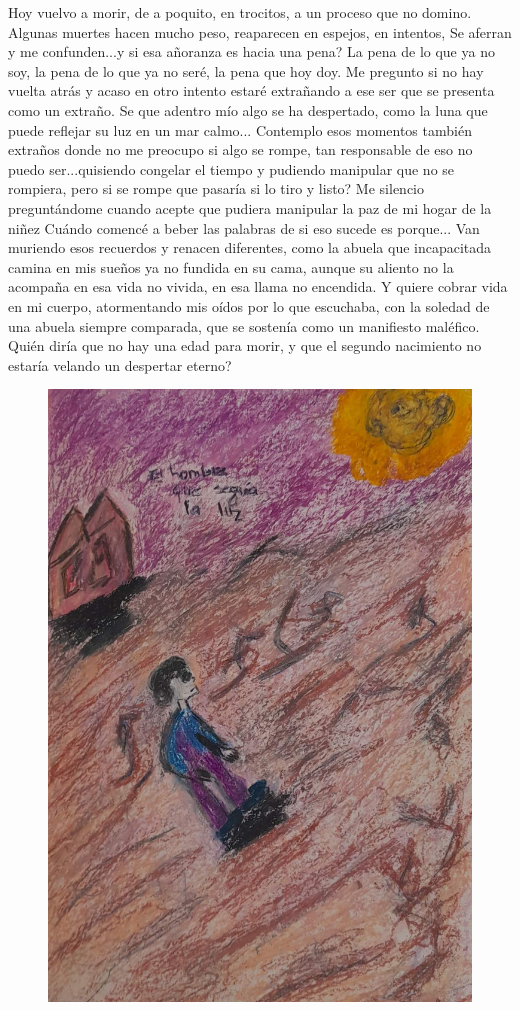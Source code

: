 \documentclass[12pt, a4paper, twoside]{book} %
\begin{document}
Hoy vuelvo a morir, de a poquito, en trocitos, a un proceso que no domino.
Algunas muertes hacen mucho peso, reaparecen en espejos, en intentos,
Se aferran y me confunden...y si esa añoranza es hacia una pena?
La pena de lo que ya no soy, la pena de lo que ya no seré, la pena que hoy doy.
Me pregunto si no hay vuelta atrás y acaso en otro intento estaré extrañando a ese ser que se presenta como un extraño.
Se que adentro mío algo se ha despertado, como la luna que puede reflejar su luz en un mar calmo...
Contemplo esos momentos también extraños donde no me preocupo si algo se rompe, tan responsable de eso no puedo ser...quisiendo congelar el tiempo  y pudiendo manipular que no se rompiera, pero si se rompe que pasaría si lo tiro y listo?
Me silencio preguntándome cuando acepte que pudiera manipular la paz  de mi hogar de la niñez
Cuándo comencé a beber las palabras de si eso sucede es porque...
Van muriendo esos recuerdos y renacen diferentes,  como la abuela que incapacitada camina en mis sueños ya no fundida en su cama, aunque su aliento no la acompaña en esa vida no vivida, en esa llama no encendida.
Y quiere cobrar vida en mi cuerpo, atormentando mis oídos por lo que escuchaba, con la soledad de una abuela siempre comparada, que se sostenía como un manifiesto maléfico.
Quién diría que no hay una edad para morir, y que el segundo nacimiento no estaría velando un despertar eterno?

\begin{figure}[H]
	\centering
	\includegraphics[width=\textwidth]{./images/1f81324dd99091.jpg}
\end{figure}
\end{document}
